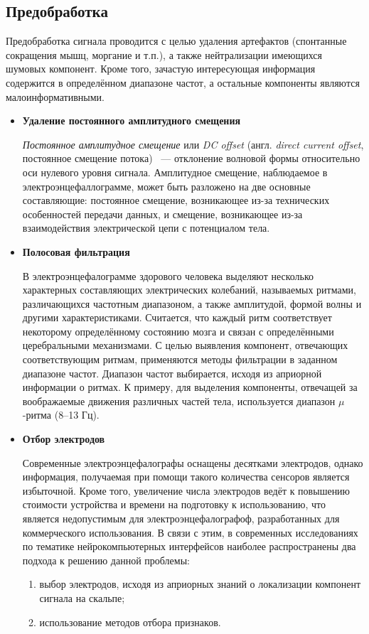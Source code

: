 \documentclass[12pt,fleqn]{article}
\begin{document}
	\subsection{Предобработка}
	\par Предобработка сигнала проводится с целью удаления артефактов (спонтанные сокращения мышц, моргание и т.п.), а также нейтрализации имеющихся шумовых компонент. Кроме того, зачастую интересующая информация содержится в определённом диапазоне частот, а остальные компоненты являются малоинформативными.
	\begin{itemize}
	\item {\bf Удаление постоянного амплитудного смещения}
	\par {\it Постоянное амплитудное смещение} или {\it DC offset} (англ. {\it direct current offset}, постоянное смещение потока) ~--- отклонение волновой формы относительно оси нулевого уровня сигнала. Амплитудное смещение, наблюдаемое в электроэнцефаллограмме, может быть разложено на две основные составляющие: постоянное смещение, возникающее из-за технических особенностей передачи данных, и  смещение, возникающее из-за взаимодействия электрической цепи с потенциалом тела.
	\item {\bf Полосовая фильтрация}
	\par В электроэнцефалограмме здорового человека выделяют несколько характерных составляющих электрических колебаний, называемых ритмами, различающихся частотным диапазоном, а также амплитудой, формой волны и другими характеристиками. Считается, что каждый ритм соответствует некоторому определённому состоянию мозга и связан с определёнными церебральными механизмами. С целью выявления компонент, отвечающих соответствующим ритмам, применяются методы фильтрации в заданном диапазоне частот. Диапазон частот выбирается, исходя из априорной информации о ритмах. К примеру, для выделения компоненты, отвечащей за воображаемые движения различных частей тела, используется диапазон $\mu$-ритма (8--13 Гц).
	\item {\bf Отбор электродов}
	\par Современные электроэнцефалографы оснащены десятками электродов, однако информация, получаемая при помощи такого количества сенсоров является избыточной. Кроме того, увеличение числа электродов ведёт к повышению стоимости устройства и времени на подготовку к использованию, что является недопустимым для электроэнцефалографоф, разработанных для коммерческого использования. В связи с этим, в современных исследованиях по тематике нейрокомпьютерных интерфейсов наиболее распространены два подхода к решению данной проблемы:
	\begin{enumerate}
	\item выбор электродов, исходя из априорных знаний о локализации компонент сигнала на скальпе;
	\item использование методов отбора признаков.
	\end{enumerate}
	\end{itemize}
\end{document}

